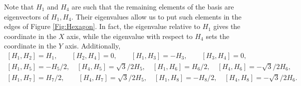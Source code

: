 \documentclass[12pt]{article}
\theoremstyle{plain}
\theoremstyle{definition}
\numberwithin{equation}{section}
\begin{document}
Note that  $H_1$ and $H_4$ are such that the remaining elements of the basis are eigenvectors of $H_1,H_4$. Their eigenvalues allow us to put such elements in the edges of Figure  \ref{Fig:Hexagon}. In fact, the eigenvalue relative to $H_1$ gives the coordinate in the $X$ axis, while the eigenvalue with respect to $H_4$ sets the coordinate in the $Y$ axis. Additionally, 
$$
\begin{gathered}
[H_1,H_2]=H_1,\qquad [H_2,H_4]=0,\qquad [H_1,H_3]=-H_3,\qquad [H_3,H_4]=0,\qquad \\ [H_1,H_5]=-H_5/2,\quad [H_4,H_5]=\sqrt{3}/2H_5,\quad [H_1,H_6]=H_6/2,\quad [H_4,H_6]=-\sqrt{3}/2H_6,\\
[H_1,H_7]=H_7/2,\qquad [H_4,H_7]=\sqrt{3}/2H_5,\quad [H_1,H_8]=-H_8/2,\quad [H_4,H_8]=-\sqrt{3}/2H_6.
\end{gathered}
$$
\end{document}
